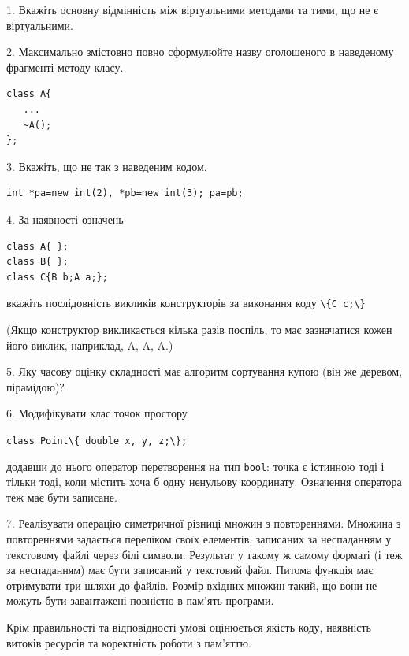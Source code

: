 \documentclass[12pt, ukrainian]{article}
\def\code#1{\Verb!#1!}
\begin{document}
{%
1. Вкажіть основну відмінність між віртуальними методами та тими, що не є віртуальними.%
\par
\vspace{2mm}
2. Максимально змістовно повно сформулюйте назву оголошеного в наведеному фрагменті методу класу.
\vspace{-3mm}
\begin{verbatim}class A{
   ...
   ~A();
};\end{verbatim}
\vspace{-3mm}
\par
\vspace{2mm}
3. Вкажіть, що не так з наведеним кодом.
\vspace{-3mm}
\begin{verbatim}int *pa=new int(2), *pb=new int(3); pa=pb;\end{verbatim}
\vspace{-3mm}
\par
\vspace{2mm}
4. За наявності означень
\vspace{-3mm}
\begin{verbatim}
class A{ };
class B{ };
class C{B b;A a;};\end{verbatim}
\vspace{-3mm}
вкажіть послідовність викликів конструкторів за виконання коду \code{\{C c;\}} 

(Якщо конструктор викликається кілька разів поспіль, то має зазначатися кожен його виклик, наприклад, A, A, A.)

\vspace{2mm}
5. Яку часову оцінку складності має алгоритм сортування купою (він же деревом, пірамідою)?
\par
\vspace{2mm}
6. Модифікувати клас точок простору 

\qquad\code{class Point\{ double x, y, z;\};}


додавши до нього оператор перетворення на тип \code{bool}: точка є істинною тоді і тільки тоді, коли містить хоча б одну ненульову координату. Означення оператора теж має бути записане.%
\par
\vspace{2mm}
7. 
Реалізувати операцію симетричної різниці множин з повтореннями. Множина з повтореннями задається переліком своїх елементів, записаних за неспаданням у текстовому файлі через білі символи. Результат у такому ж самому форматі (і теж за неспаданням) має бути записаний у текстовий файл. Питома функція має отримувати три шляхи до файлів. Розмір вхідних множин такий, що вони не можуть бути завантажені повністю в пам’ять програми.

Крім правильності та відповідності умові оцінюється якість коду, наявність витоків ресурсів та коректність роботи з пам'яттю. 

}
\end{document}
